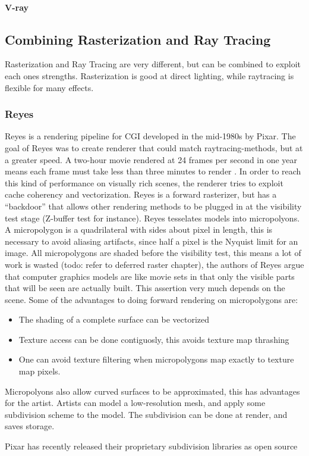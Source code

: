 	\paragraph {V-ray}

\subsection {Combining Rasterization and Ray Tracing}
	Rasterization and Ray Tracing are very different, but can be combined to exploit each ones strengths. Rasterization is good at direct lighting, while raytracing is flexible for many effects.

\subsubsection {Reyes}
	\def\onequarter{\sfrac{1}{4}}
  \def\onehalf{\sfrac{1}{2}}
  
	Reyes is a rendering pipeline for CGI developed in the mid-1980s by Pixar. The goal of Reyes was to create renderer that could match raytracing-methods, but at a greater speed. A two-hour movie rendered at 24 frames per second in one year means each frame must take less than three minutes to render \cite{reyes1987}. In order to reach this kind of performance on visually rich scenes, the renderer tries to exploit cache coherency and vectorization. Reyes is a forward rasterizer, but has a ``backdoor'' that allows other rendering methods to be plugged in at the visibility test stage (Z-buffer test for instance). Reyes tesselates models into micropolyons. A micropolygon is a quadrilateral with sides about \onehalf pixel in length, this is necessary to avoid aliasing artifacts, since half a pixel is the Nyquist limit for an image. All micropolygons are shaded before the visibility test, this means a lot of work is wasted (todo: refer to deferred raster chapter), the authors of Reyes argue that computer graphics models are like movie sets in that only the visible parts that will be seen are actually built. This assertion very much depends on the scene. Some of the advantages to doing forward rendering on micropolygons are:
	
\begin{itemize}
	\item The shading of a complete surface can be vectorized
	\item Texture access can be done contiguosly, this avoids texture map thrashing
	\item One can avoid texture filtering when micropolygons map exactly to texture map pixels.
\end{itemize}
	
	Micropolyons also allow curved surfaces to be approximated, this has advantages for the artist. Artists can model a low-resolution mesh, and apply some subdivision scheme to the model. The subdivision can be done at render, and saves storage.
	
	Pixar has recently released their proprietary subdivision libraries as open source \cite{pixar_subdiv}
	
	
